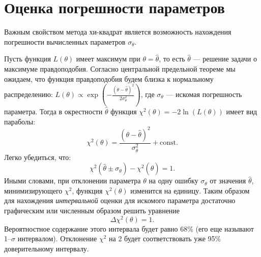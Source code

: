 \section{Оценка погрешности параметров}

Важным свойством метода хи-квадрат является  возможность
нахождения погрешности вычисленных параметров $\sigma_{\theta}$.

Пусть функция $L(\theta)$ имеет максимум при $\theta = \hat{\theta}$, то есть 
$\hat{\theta}$ --- решение задачи о максимуме правдоподобия. Согласно центральной предельной теореме мы ожидаем, что функция правдоподобия будем близка к нормальному распределению: $L(\theta) \propto \exp\left(-\frac{(\theta - \hat{\theta})^2}{2 \sigma_\theta^2}\right) $, 
где $\sigma_\theta$ --- искомая погрешность параметра. Тогда в окрестности $\hat{\theta}$ функция $\chi^2(\theta) = -2 \ln(L(\theta))$ имеет вид параболы:
\[
\chi^2(\theta) = \frac{(\theta - \hat{\theta})^2}{\sigma_{\theta}^2} +\mathrm{const}.
\]
Легко убедиться, что:
\begin{equation*}
    \chi^2(\hat{\theta} \pm \sigma_\theta) - \chi^2(\hat{\theta}) = 1.
\end{equation*}
Иными словами, при отклонении параметра $\theta$ на одну ошибку $\sigma_{\theta}$ от значения
$\hat{\theta}$, 
минимизирующего $\chi^2$, функция $\chi^2(\theta)$ изменится на единицу. Таким образом для нахождения \emph{интервальной} оценки для искомого параметра достаточно графическим или численным образом решить уравнение
\begin{equation}
    \Delta \chi^2(\theta) = 1.
\end{equation}
Вероятностное содержание этого интервала будет равно 68\% (его еще называют 1--$\sigma$ интервалом). 
Отклонение $\chi^2$ на 2 будет соответствовать уже 95\% доверительному интервалу.


